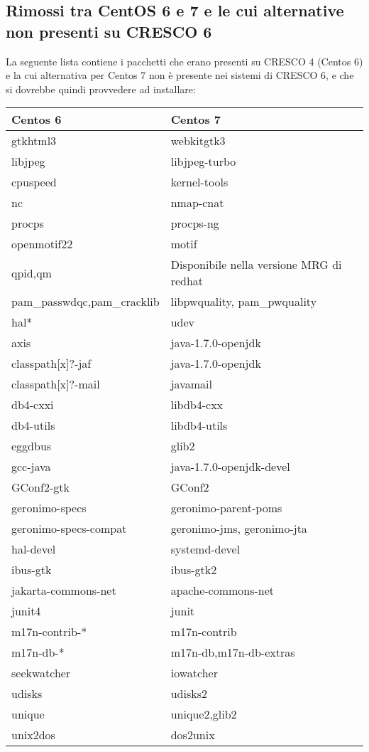\documentclass[11pt]{article}
\begin{document}
\subsection{Rimossi tra CentOS 6 e 7 e le cui alternative non presenti su CRESCO 6}
La seguente lista contiene i pacchetti che erano presenti su CRESCO 4 (Centos 6) e la cui alternativa per Centos 7 non è presente
nei sistemi di CRESCO 6, e che si dovrebbe quindi provvedere ad installare:
\begin{center}
	\renewcommand{\arraystretch}{1.5}
	\begin{tabular}{|l|l|}
		\hline
		\rowcolor{hgray}
		\textbf{Centos 6} & \textbf{Centos 7} \\
		\hline
		gtkhtml3 & webkitgtk3 \\ \hline
		libjpeg & libjpeg-turbo \\ \hline
		cpuspeed & kernel-tools \\ \hline
		nc & nmap-cnat \\ \hline
		procps & procps-ng \\ \hline
		openmotif22 & motif \\ \hline
		qpid,qm & Disponibile nella versione MRG di redhat \\ \hline
		pam\_passwdqc,pam\_cracklib & libpwquality, pam\_pwquality \\ \hline
		hal* & udev \\ \hline
		axis & java-1.7.0-openjdk \\ \hline
		classpath[x]?-jaf & java-1.7.0-openjdk \\ \hline
		classpath[x]?-mail & javamail \\ \hline
		db4-cxxi & libdb4-cxx \\ \hline
		db4-utils & libdb4-utils \\ \hline
		eggdbus & glib2 \\ \hline
		gcc-java & java-1.7.0-openjdk-devel \\ \hline
		GConf2-gtk & GConf2 \\ \hline
		geronimo-specs & geronimo-parent-poms \\ \hline
		geronimo-specs-compat & geronimo-jms, geronimo-jta \\ \hline
		hal-devel & systemd-devel \\ \hline
		ibus-gtk & ibus-gtk2 \\ \hline
		jakarta-commons-net & apache-commons-net \\ \hline
		junit4 & junit \\ \hline
		m17n-contrib-* & m17n-contrib \\ \hline
		m17n-db-* & m17n-db,m17n-db-extras \\ \hline
		seekwatcher & iowatcher \\ \hline
		udisks & udisks2 \\ \hline
		unique & unique2,glib2 \\ \hline
		unix2dos & dos2unix \\ \hline
	\end{tabular}
\end{center}
\end{document}
